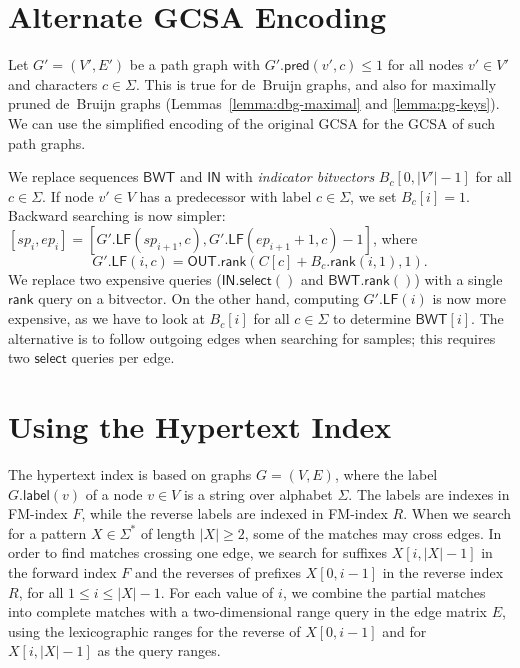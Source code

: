 \documentclass[a4paper,11pt]{llncs}
\newcommand{\abs}[1]{\ensuremath{\lvert #1 \rvert}}
\newcommand{\rank}{\ensuremath{\mathsf{rank}}}
\newcommand{\select}{\ensuremath{\mathsf{select}}}
\newcommand{\LF}{\ensuremath{\mathsf{LF}}}
\newcommand{\glabel}{\ensuremath{\mathsf{label}}}
\newcommand{\gpred}{\ensuremath{\mathsf{pred}}}
\newcommand{\BWT}{\ensuremath{\mathsf{BWT}}}
\newcommand{\bvIN}{\ensuremath{\mathsf{IN}}}
\newcommand{\bvOUT}{\ensuremath{\mathsf{OUT}}}
\begin{document}
\section{Alternate GCSA Encoding}\label{appendix:encoding}

Let $G' = (V', E')$ be a path graph with $G'.\gpred(v', c) \le 1$ for all nodes $v' \in V'$ and characters $c \in \Sigma$. This is true for de~Bruijn graphs, and also for maximally pruned de~Bruijn graphs (Lemmas~\ref{lemma:dbg-maximal} and \ref{lemma:pg-keys}). We can use the simplified encoding of the original GCSA \cite{Siren2014} for the GCSA of such path graphs.

We replace sequences $\BWT$ and $\bvIN$ with \emph{indicator bitvectors} $B_{c}[0, \abs{V'}-1]$ for all $c \in \Sigma$. If node $v' \in V$ has a predecessor with label $c \in \Sigma$, we set $B_{c}[i] = 1$. Backward searching is now simpler: $[sp_{i}, ep_{i}] = [G'.\LF(sp_{i+1}, c), G'.\LF(ep_{i+1}+1, c) - 1]$, where
$$
G'.\LF(i, c) = \bvOUT.\rank(C[c] + B_{c}.\rank(i, 1), 1).
$$
We replace two expensive queries ($\bvIN.\select()$ and $\BWT.\rank()$) with a single $\rank$ query on a bitvector. On the other hand, computing $G'.\LF(i)$ is now more expensive, as we have to look at $B_{c}[i]$ for all $c \in \Sigma$ to determine $\BWT[i]$. The alternative is to follow outgoing edges when searching for samples; this requires two $\select$ queries per edge.


\section{Using the Hypertext Index}\label{appendix:hypertext}

The hypertext index \cite{Thachuk2013} is based on graphs $G = (V, E)$, where the label $G.\glabel(v)$ of a node $v \in V$ is a string over alphabet $\Sigma$. The labels are indexes in FM\nobreakdash-index $F$, while the reverse labels are indexed in FM\nobreakdash-index $R$. When we search for a pattern $X \in \Sigma^{\ast}$ of length $\abs{X} \ge 2$, some of the matches may cross edges. In order to find matches crossing one edge, we search for suffixes $X[i, \abs{X}-1]$ in the forward index $F$ and the reverses of prefixes $X[0, i-1]$ in the reverse index $R$, for all $1 \le i \le \abs{X}-1$. For each value of $i$, we combine the partial matches into complete matches with a two-dimensional range query in the edge matrix $E$, using the lexicographic ranges for the reverse of $X[0, i-1]$ and for $X[i, \abs{X}-1]$ as the query ranges.
\end{document}
